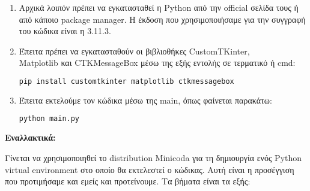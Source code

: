 \documentclass[12pt,a4paper]{article}
\begin{document}
\begin{enumerate}
    \item Αρχικά λοιπόν πρέπει να εγκατασταθεί η Python από την official σελίδα τους ή από κάποιο package manager. Η έκδοση που χρησιμοποιήσαμε για την συγγραφή του κώδικα είναι η 3.11.3.

    \item Έπειτα πρέπει να εγκατασταθούν οι βιβλιοθήκες CustomTKinter,\\Matplotlib και CTKMessageBox μέσω της εξής εντολής σε τερματικό ή cmd:

\begin{lstlisting}[language=Bash]
pip install customtkinter matplotlib ctkmessagebox\end{lstlisting}

    \item Έπειτα εκτελούμε τον κώδικα μέσω της main, όπως φαίνεται παρακάτω:

\begin{lstlisting}[language=Bash]
python main.py\end{lstlisting}
\end{enumerate}

\textbf{Εναλλακτικά:}

Γίνεται να χρησιμοποιηθεί το distribution Minicoda για τη δημιουργία ενός Python virtual environment στο οποίο θα εκτελεστεί ο κώδικας. Αυτή είναι η προσέγγιση που προτιμήσαμε και εμείς και προτείνουμε. Τα βήματα είναι τα εξής:
\end{document}
